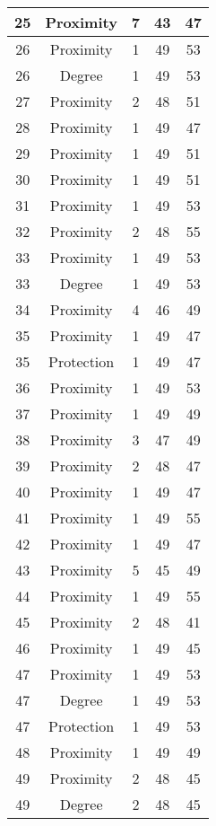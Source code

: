 \documentclass[results.tex]{subfiles}
\begin{document}
\begin{center}
\begin{tabular}{| c || c | c | c | c |}
    \hline
    25 & Proximity & 7 & 43 & 47 \\ 
    \hline
    26 & Proximity & 1 & 49 & 53 \\ 
    \hline
    26 & Degree & 1 & 49 & 53 \\ 
    \hline
    27 & Proximity & 2 & 48 & 51 \\ 
    \hline
    28 & Proximity & 1 & 49 & 47 \\ 
    \hline
    29 & Proximity & 1 & 49 & 51 \\ 
    \hline
    30 & Proximity & 1 & 49 & 51 \\ 
    \hline
    31 & Proximity & 1 & 49 & 53 \\ 
    \hline
    32 & Proximity & 2 & 48 & 55 \\ 
    \hline
    33 & Proximity & 1 & 49 & 53 \\ 
    \hline
    33 & Degree & 1 & 49 & 53 \\ 
    \hline
    34 & Proximity & 4 & 46 & 49 \\ 
    \hline
    35 & Proximity & 1 & 49 & 47 \\ 
    \hline
    35 & Protection & 1 & 49 & 47 \\ 
    \hline
    36 & Proximity & 1 & 49 & 53 \\ 
    \hline
    37 & Proximity & 1 & 49 & 49 \\ 
    \hline
    38 & Proximity & 3 & 47 & 49 \\ 
    \hline
    39 & Proximity & 2 & 48 & 47 \\ 
    \hline
    40 & Proximity & 1 & 49 & 47 \\ 
    \hline
    41 & Proximity & 1 & 49 & 55 \\ 
    \hline
    42 & Proximity & 1 & 49 & 47 \\ 
    \hline
    43 & Proximity & 5 & 45 & 49 \\ 
    \hline
    44 & Proximity & 1 & 49 & 55 \\ 
    \hline
    45 & Proximity & 2 & 48 & 41 \\ 
    \hline
    46 & Proximity & 1 & 49 & 45 \\ 
    \hline
    47 & Proximity & 1 & 49 & 53 \\ 
    \hline
    47 & Degree & 1 & 49 & 53 \\ 
    \hline
    47 & Protection & 1 & 49 & 53 \\ 
    \hline
    48 & Proximity & 1 & 49 & 49 \\ 
    \hline
    49 & Proximity & 2 & 48 & 45 \\ 
    \hline
    49 & Degree & 2 & 48 & 45 \\ 
    \hline   \end{tabular}
\end{center}
\end{document}
